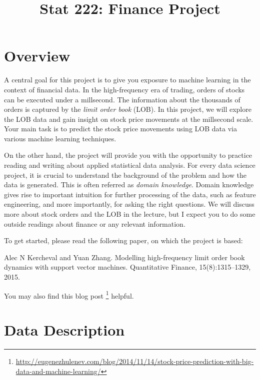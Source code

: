 \documentclass[11pt, oneside]{article}   	%
\title{Stat 222: Finance Project}
\date{}							%
\begin{document}
\maketitle

\section{Overview}
A central goal for this project is to give you exposure to machine learning
in the context of financial data.
In the high-frequency era of trading, orders of stocks can be executed under a millsecond. 
The information about the thousands of orders is captured by the \textit{limit order book} (LOB). 
In this project, we will explore the LOB data and gain insight on stock price movements 
at the millsecond scale. Your main task is to predict the stock price movements using LOB data via various machine learning techniques.

On the other hand, the project will provide you
with the opportunity to practice reading and writing about applied statistical
data analysis.
For every data science project, it is crucial to understand the background of the problem 
and how the data is generated. This is often referred as \textit{domain knowledge}. 
Domain knowledge gives rise to important intuition for further processing of the data, 
such as feature engineering, and more importantly, for asking the right questions. 
We will discuss more about stock orders and the LOB in the lecture, but I expect 
you to do some outside readings about finance or any relevant information.

To get started, please read the following paper, on which the project is based:

Alec N Kercheval and Yuan Zhang. Modelling high-frequency limit order book dynamics with support vector machines. Quantitative Finance, 15(8):1315–1329, 2015. \cite{kercheval2015modelling}

You may also find this blog
post \footnote{\url{http://eugenezhulenev.com/blog/2014/11/14/stock-price-prediction-with-big-data-and-machine-learning/}}
helpful.

\section{Data Description}
\end{document}
